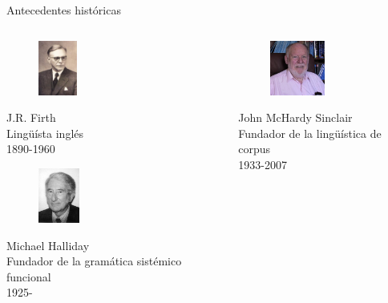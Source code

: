 \documentclass{beamer}
\begin{document}
\begin{frame}{Antecedentes históricas}
	\begin{columns}
    	\begin{column}{6cm}
        	\begin{figure}
    		\includegraphics[height=1.8cm]{firth.png}
       		\end{figure}
            \begin{center}
				\tiny
				J.R. Firth \\
				Lingüísta inglés \\
				1890-1960\\
			\end{center}
       		\begin{figure}
           		\includegraphics[height=1.8cm]{halliday.jpg}
			\end{figure}
            \begin{center}
				\tiny
				Michael Halliday \\
				Fundador de la gramática sistémico funcional \\
				1925-\\
			\end{center}
        \end{column}
        \begin{column}{6cm}
        	\begin{flushleft}
            \begin{figure}
       	 		\includegraphics[height=1.8cm]{sinclair.jpg}
        	\end{figure}
            \begin{center}
            \tiny
			John McHardy Sinclair \\
			Fundador de la lingüística de corpus \\
			1933-2007\\
            \end{center}
            \end{flushleft}
        \end{column}
    \end{columns}
\end{frame}
\end{document}
